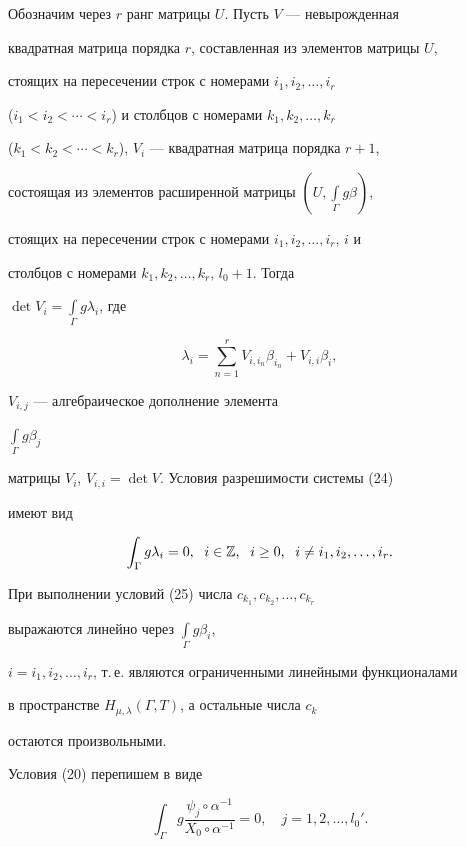 Обозначим через $r$ ранг матрицы $U$. Пусть $V$ --- невырожденная


квадратная матрица порядка $r$, составленная из элементов матрицы $U$,


стоящих на пересечении строк с номерами $i_1,i_2,\dotsc,i_r$


($i_1<i_2<\dotsb <i_r$) и столбцов с номерами $k_1,k_2,\dotsc,k_r$


($k_1<k_2<\dotsb <k_r$), $V_i$ --- квадратная матрица порядка $r+1$,


состоящая из элементов расширенной матрицы $(U,\int\limits_\Gamma g\beta)$,


стоящих на пересечении строк с номерами $i_1,i_2,\dotsc,i_r,\,i$ и


столбцов с номерами $k_1,k_2,\dotsc,k_r,\,l_0+1$. Тогда


$\det V_i=\int\limits_\Gamma g\lambda_i$, где


$$


\lambda_i=\sum_{n=1}^rV_{i,i_n}\beta_{i_n}+V_{i,i}\beta_i,


$$


$V_{i,j}$ --- алгебраическое дополнение элемента


$\int\limits_\Gamma g\beta_j$


матрицы $V_i$, $V_{i,i}=\det V$. Условия разрешимости системы (24)


имеют вид


\begin{equation}


\int_\Gamma g\lambda_i=0,\ \; i\in \Bbb Z,\ \; i\ge 0,


\ \; i\ne i_1,i_2,\dotsc,i_r.


\end{equation}


При выполнении условий (25) числа $c_{k_1}, c_{k_2},\dotsc,c_{k_r}$


выражаются линейно через $\int\limits_\Gamma g\beta_i$,


$i=i_1,i_2,\dotsc,i_r$, т.\,е. являются ограниченными линейными функционалами


в пространстве $H_{\mu,\lambda}(\Gamma,T)$, а остальные числа $c_k$


остаются произвольными.





Условия (20) перепишем в виде


\begin{equation}


\int_{\Gamma}g\frac{\psi_j\circ \alpha^{-1}}{X_0\circ \alpha^{-1}}=0,


\quad j=1, 2,\dotsc,l_0'.


\end{equation}


